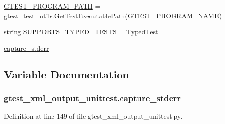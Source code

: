 \begin{DoxyCompactItemize}
\item 
\hyperlink{namespacegtest__xml__output__unittest_a8c4cf6e9b6a184278a1b2759e5eaec6b}{G\+T\+E\+S\+T\+\_\+\+P\+R\+O\+G\+R\+A\+M\+\_\+\+P\+A\+TH} = \hyperlink{namespacegtest__test__utils_a89ed3717984a80ffbb7a9c92f71b86a2}{gtest\+\_\+test\+\_\+utils.\+Get\+Test\+Executable\+Path}(\hyperlink{namespacegtest__xml__output__unittest_ab89cc5b402310ef67bcaf38fa5017461}{G\+T\+E\+S\+T\+\_\+\+P\+R\+O\+G\+R\+A\+M\+\_\+\+N\+A\+ME})
\item 
string \hyperlink{namespacegtest__xml__output__unittest_a07eecd027d660022c0ab447f3c3e0f2e}{S\+U\+P\+P\+O\+R\+T\+S\+\_\+\+T\+Y\+P\+E\+D\+\_\+\+T\+E\+S\+TS} = \textquotesingle{}\hyperlink{class_typed_test}{Typed\+Test}\textquotesingle{}
\item 
\hyperlink{namespacegtest__xml__output__unittest_a143c9ca62f439947dde9eb76bfe243e3}{capture\+\_\+stderr}
\end{DoxyCompactItemize}


\subsection{Variable Documentation}
\subsubsection[{\texorpdfstring{capture\+\_\+stderr}{capture_stderr}}]{\setlength{\rightskip}{0pt plus 5cm}gtest\+\_\+xml\+\_\+output\+\_\+unittest.\+capture\+\_\+stderr}\hypertarget{namespacegtest__xml__output__unittest_a143c9ca62f439947dde9eb76bfe243e3}{}\label{namespacegtest__xml__output__unittest_a143c9ca62f439947dde9eb76bfe243e3}


Definition at line 149 of file gtest\+\_\+xml\+\_\+output\+\_\+unittest.\+py.

